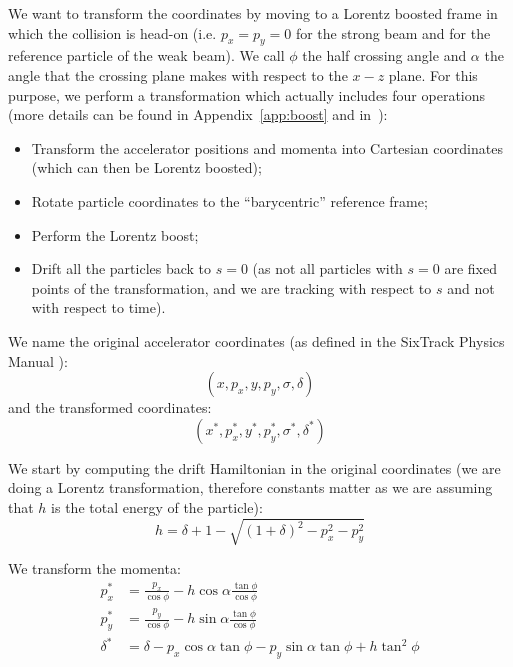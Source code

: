We want to transform the coordinates by moving to a Lorentz boosted frame in which the collision is head-on (i.e. $p_x=p_y=0$ for the strong beam and for the reference particle of the weak beam). We call $\phi$ the half crossing angle and $\alpha$ the angle that the crossing plane makes with respect to the $x-z$ plane. For this purpose, we perform a transformation which actually includes four operations (more details can be found in Appendix~\ref{app:boost} and in~\cite{slides, refpaper}):
\begin{itemize}
\item Transform the accelerator positions and momenta into Cartesian coordinates (which can then be Lorentz boosted);
\item Rotate particle coordinates to the ``barycentric'' reference frame;
\item Perform the Lorentz boost;
\item Drift all the particles back to $s=0$ (as not all particles with $s=0$ are fixed points of the transformation, and we are tracking with respect to $s$ and not with respect to time).
\end{itemize}

We name the original accelerator coordinates (as defined in the SixTrack Physics Manual \cite{sixtrack}):
\begin{equation}
\left(x, p_x, y, p_y, \sigma, \delta\right)
\end{equation}
and the transformed coordinates:
\begin{equation}
\left(x^*, p_x^*, y^*, p_y^*, \sigma^*, \delta^*\right)
\end{equation}



We start by computing the drift Hamiltonian in the original coordinates (we are doing a Lorentz transformation, therefore constants matter as we are assuming that $h$ is the total energy of the particle):
\begin{equation}
h = \delta + 1 -\sqrt{\left(1+\delta\right)^2-p_x^2-p_y^2}
\end{equation}

We transform the momenta:
\begin{align}
p_x^* &= \frac{p_x}{\cos \phi} - h \cos \alpha \frac{\tan \phi}{\cos \phi} \label{eq:px}\\ 
p_y^* & = \frac{p_y}{\cos \phi} - h \sin \alpha \frac{\tan \phi}{\cos \phi}\\ 
\delta^* & = \delta -p_x \cos \alpha \tan \phi - p_y \sin \alpha \tan \phi +h \tan^2 \phi \label{eq:delta}
\end{align}

